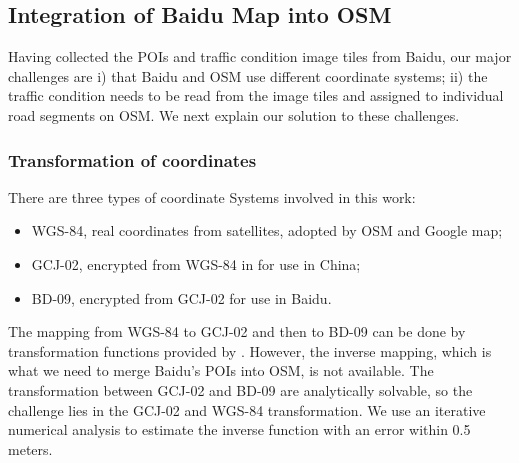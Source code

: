 \subsection{Integration of Baidu Map  into OSM}
\label{sec:integrate}
Having collected the POIs and traffic condition image tiles from Baidu,
our major challenges are i) that Baidu and OSM use different 
coordinate systems; ii) the traffic condition needs to be read from
the image tiles and assigned to individual road segments on OSM. 
We next explain our solution to these challenges.

\subsubsection{Transformation of coordinates}
There are three types of coordinate Systems involved in this work:
\begin{itemize}\itemsep0pt
    \item WGS-84, real coordinates from satellites, adopted by OSM and Google map;
    \item GCJ-02, encrypted from WGS-84 in for use in China;
    \item BD-09, encrypted from GCJ-02 for use in Baidu.
\end{itemize}

The mapping from WGS-84 to GCJ-02 and then to BD-09 can be done 
by transformation functions provided by \cite{coordinatechange}.
However, the inverse mapping, which is what we need to merge
Baidu's POIs into OSM, is not available. The transformation between GCJ-02 and BD-09 are analytically solvable, so the challenge lies in the GCJ-02 and WGS-84 transformation. We use an iterative numerical analysis to estimate the inverse function with an error within 0.5 meters. 

